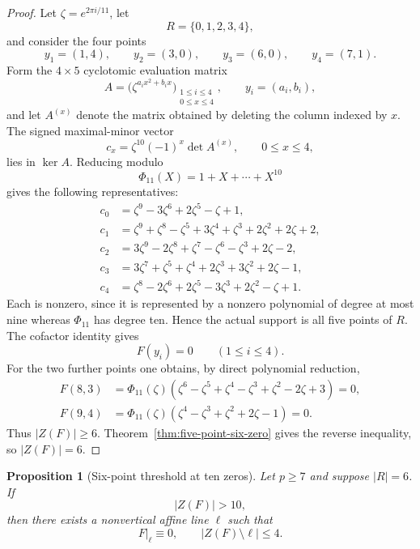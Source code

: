 \documentclass[11pt]{article}
\newtheorem{proposition}[theorem]{Proposition}
\begin{document}
\begin{proof}
Let $\zeta=e^{2\pi i/11}$, let
\[
 R=\{0,1,2,3,4\},
\]
and consider the four points
\[
 y_1=(1,4),\qquad y_2=(3,0),\qquad
 y_3=(6,0),\qquad y_4=(7,1).
\]
Form the $4\times5$ cyclotomic evaluation matrix
\[
 A=\bigl(\zeta^{a_i x^2+b_i x}\bigr)_
 {\substack{1\le i\le4\\0\le x\le4}},
 \qquad y_i=(a_i,b_i),
\]
and let $A^{(x)}$ denote the matrix obtained by deleting the column indexed
by $x$.  The signed maximal-minor vector
\[
 c_x=\zeta^{10}(-1)^x\det A^{(x)},\qquad 0\le x\le4,
\]
lies in $\ker A$.  Reducing modulo
\[
 \Phi_{11}(X)=1+X+\cdots+X^{10}
\]
gives the following representatives:
\begin{align*}
 c_0&=\zeta^9-3\zeta^6+2\zeta^5-\zeta+1,\\
 c_1&=\zeta^9+\zeta^8-\zeta^5+3\zeta^4+\zeta^3
       +2\zeta^2+2\zeta+2,\\
 c_2&=3\zeta^9-2\zeta^8+\zeta^7-\zeta^6-\zeta^3+2\zeta-2,\\
 c_3&=3\zeta^7+\zeta^5+\zeta^4+2\zeta^3+3\zeta^2+2\zeta-1,\\
 c_4&=\zeta^8-2\zeta^6+2\zeta^5-3\zeta^3+2\zeta^2-\zeta+1.
\end{align*}
Each is nonzero, since it is represented by a nonzero polynomial of degree
at most nine whereas $\Phi_{11}$ has degree ten.  Hence the actual support
is all five points of $R$.  The cofactor identity gives
\[
 F(y_i)=0\qquad(1\le i\le4).
\]
For the two further points one obtains, by direct polynomial reduction,
\begin{align*}
 F(8,3)
 &=\Phi_{11}(\zeta)
   (\zeta^6-\zeta^5+\zeta^4-\zeta^3+\zeta^2-2\zeta+3)=0,\\
 F(9,4)
 &=\Phi_{11}(\zeta)
   (\zeta^4-\zeta^3+\zeta^2+2\zeta-1)=0.
\end{align*}
Thus $|Z(F)|\ge6$.  Theorem~\ref{thm:five-point-six-zero} gives the reverse
inequality, so $|Z(F)|=6$.
\end{proof}



\begin{proposition}[Six-point threshold at ten zeros]
\label{prop:six-point-ten-threshold}
Let \(p\ge7\) and suppose \(|R|=6\).  If
\[
 |Z(F)|>10,
\]
then there exists a nonvertical affine line \(\ell\) such that
\begin{equation}
 F|_\ell\equiv0,
 \qquad
 \boxed{|Z(F)\setminus\ell|\le4.}
 \label{eq:six-point-ten-structure}
\end{equation}
\end{proposition}
\end{document}

